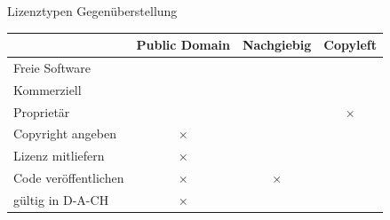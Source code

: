 \begin{frame}{Lizenztypen Gegenüberstellung}
	\begin{tabular}{lccc}
		& Public Domain & Nachgiebig & Copyleft \\ 
		\hline 
		Freie Software & \checkmark & \checkmark & \checkmark \\ 
		\hline 
		Kommerziell & \checkmark & \checkmark & \checkmark \\ 
		\hline 
		Proprietär & \checkmark & \checkmark & $\times$ \\ 
		\hline 
		Copyright angeben & $\times$ & \checkmark & \checkmark \\ 
		\hline 
		Lizenz mitliefern & $\times$ & \checkmark & \checkmark \\ 
		\hline 
		Code veröffentlichen & $\times$ & $\times$ & \checkmark \\ 
		\hline 
		gültig in D-A-CH & $\times$ & \checkmark & \checkmark \\
		\hline 
	\end{tabular} 
\end{frame}{

}
